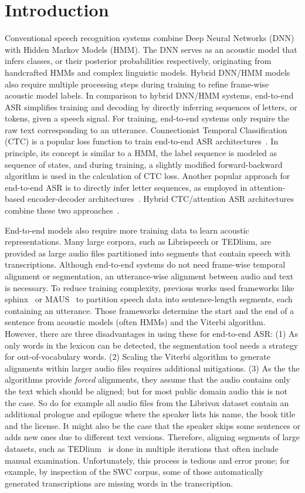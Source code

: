 \documentclass[runningheads]{llncs}
\begin{document}
\section{Introduction}
Conventional speech recognition systems combine Deep Neural Networks (DNN) with Hidden Markov Models (HMM).
The DNN serves as an acoustic model that infers classes, or their posterior probabilities respectively, originating from handcrafted HMMs and complex linguistic models.
Hybrid DNN/HMM models also require multiple processing steps during training to refine frame-wise acoustic model labels.
In comparison to hybrid DNN/HMM systems, end-to-end ASR simplifies training and decoding by directly inferring sequences of letters, or tokens, given a speech signal.
For training, end-to-end systems only require the raw text corresponding to an utterance.
Connectionist Temporal Classification (CTC) is a popular loss function to train end-to-end ASR architectures~\cite{Graves2006}.
In principle, its concept is similar to a HMM, the label sequence is modeled as sequence of states, and during training, a slightly modified forward-backward algorithm is used in the calculation of CTC loss.
Another popular approach for end-to-end ASR is to directly infer letter sequences, as employed in attention-based encoder-decoder architectures~\cite{Chan2016}.
Hybrid CTC/attention ASR architectures combine these two approaches~\cite{Watanabe2017}.

End-to-end models also require more training data to learn acoustic representations.
Many large corpora, such as Librispeech or TEDlium, are provided as large audio files partitioned into segments that contain speech with transcriptions.
Although end-to-end systems do not need frame-wise temporal alignment or segmentation, an utterance-wise alignment between audio and text is necessary.
To reduce training complexity, previous works used frameworks like sphinx~\cite{Lamere2003} or MAUS~\cite{schiel1999} to partition speech data into sentence-length segments, each containing an utterance.
Those frameworks determine the start and the end of a sentence from acoustic models (often HMMs) and the Viterbi algorithm.
However, there are three disadvantages in using these for end-to-end ASR:
(1) As only words in the lexicon can be detected, the segmentation tool needs a strategy for out-of-vocabulary words.
(2) Scaling the Viterbi algorithm to generate alignments within larger audio files requires additional mitigations.
(3) As the the algorithms provide \emph{forced} alignments, they assume that the audio contains only the text which should be aligned; but for most public domain audio this is not the case.
So do for example all audio files from the Librivox dataset contain an additional prologue and epilogue where the speaker lists his name, the book title and the license.
It might also be the case that the speaker skips some sentences or adds new ones due to different text versions.
Therefore, aligning segments of large datasets, such as TEDlium~\cite{Rousseau2014} is done in multiple iterations that often include manual examination.
Unfortunately, this process is tedious and error prone;
{for example, by inspection of the SWC corpus, some of those automatically generated transcriptions are missing words in the transcription.}
\end{document}
